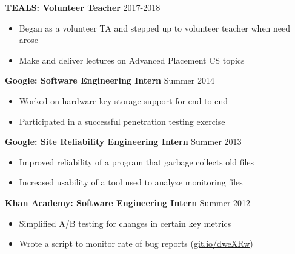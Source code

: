 \documentclass[margin]{res} \usepackage{hyperref}
\begin{document}
\begin{resume}
  \textbf{TEALS: Volunteer Teacher} \hfill 2017-2018
  \begin{minipage}{0.84\textwidth}
    \vspace{0.2em}
    \begin{itemize} \itemsep -1pt
      \item Began as a volunteer TA and stepped up to volunteer teacher when need arose
      \item Make and deliver lectures on Advanced Placement CS topics
    \end{itemize}
  \end{minipage}

  \textbf{Google: Software Engineering Intern} \hfill Summer 2014
  \begin{minipage}{0.84\textwidth}
    \vspace{0.2em}
    \begin{itemize} \itemsep -1pt
      \item Worked on hardware key storage support for end-to-end
      \item Participated in a successful penetration testing exercise
    \end{itemize}
  \end{minipage}

  \textbf{Google: Site Reliability Engineering Intern}
    \hfill Summer 2013
    \begin{minipage}{0.84\textwidth}
      \vspace{0.2em}
      \begin{itemize} \itemsep -1pt
        \item Improved reliability of a program that garbage collects old files
        \item Increased usability of a tool used to analyze monitoring files
      \end{itemize}
    \end{minipage}

  \textbf{Khan Academy: Software Engineering Intern} \hfill Summer 2012
    \begin{minipage}{0.84\textwidth}
      \vspace{0.2em}
    \begin{itemize} \itemsep -1pt
        \item Simplified A/B testing for changes in certain key metrics
        \item Wrote a script to monitor rate of bug reports
          (\href{https://github.com/Khan/beep-boop}{git.io/dweXRw})
      \end{itemize}
    \end{minipage}


\end{resume}
\end{document}
